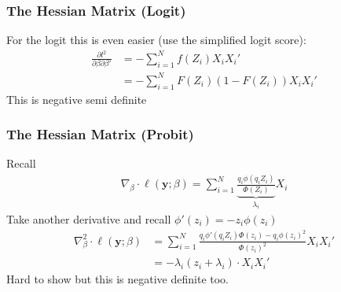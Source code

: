 \documentclass[aspectratio=169,11pt]{beamer}
\begin{document}
\begin{frame}
\frametitle{The Hessian Matrix (Logit)}
For the logit this is even easier (use the simplified logit score):
\begin{align*}
\frac{\partial l^2 }{\partial \beta \partial \beta'}  &= - \sum_{i=1}^N f(Z_i) X_i X_i' \\
&= - \sum_{i=1}^N F(Z_i) (1- F(Z_i)) X_i X_i'
\end{align*}
This is \alert{negative semi definite}
\end{frame}

\begin{frame}
\frametitle{The Hessian Matrix (Probit)}
Recall
\begin{align*}
\nabla_{\beta} \cdot \ell(\symbf{y}; \beta)= \sum_{i=1}^N \underbrace{\frac{ q_i \phi(q_i Z_i)}{\Phi(Z_i)}}_{\lambda_i} X_i
\end{align*}
Take another derivative and recall $\phi'(z_i) = - z_i \phi(z_i)$
\begin{align*}
\nabla_{\beta}^2 \cdot \ell(\symbf{y}; \beta)&= \sum_{i=1}^N \frac{q_i \phi'(q_i Z_i) \Phi(z_i) - q_i \phi(z_i)^2}{\Phi(z_i)^2}  X_i X_i' \\
&= - \lambda_i( z_i + \lambda_i) \cdot X_i X_i'
\end{align*}
Hard to show but this is \alert{negative definite} too.
\end{frame}


\end{document}
